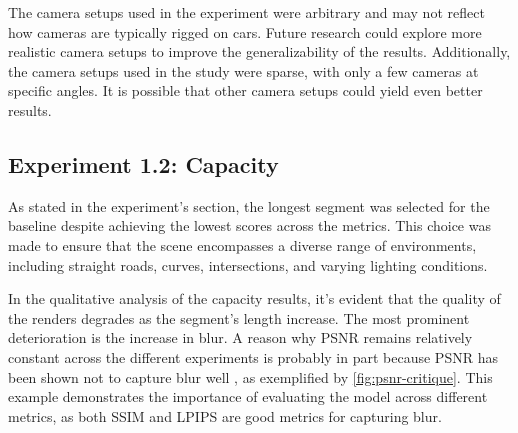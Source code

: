The camera setups used in the experiment were arbitrary and may not reflect how cameras are typically rigged on cars. Future research could explore more realistic camera setups to improve the generalizability of the results. Additionally, the camera setups used in the study were sparse, with only a few cameras at specific angles. It is possible that other camera setups could yield even better results.


\begin{comment}
- The position of the camera was arbitrary. Could've done more research into how cameras on cars usually are rigged.
- The camera setups are very sparse, a lot of different possibilities.

Results:
- Relatively little difference in the quantitative results.
- Why did the -10 and 10 yaw yield the best SSIM and LPIPS?
- The evaluation images are a subset of the training images. Because the -10 and 10 have a lot of overlap, they have a lot of common training data which will allow the model to learn the scene which it is evaluated on, in turn yielding high scores on the chosen metrics.


This overlap allows the model to train and learn the scene which it is evaluated on, because the evaluation set is a subset of the training images, more than the other setups, and it'll naturally score high on the respective images.

the model to train on the partial scene with two times the amount of data, and since the evaluation set is a subset of the training images, it'll naturally score high on the respective images.

\end{comment}










\subsection{Experiment 1.2: Capacity} 
As stated in the experiment's section, the longest segment was selected for the baseline despite achieving the lowest scores across the metrics. This choice was made to ensure that the scene encompasses a diverse range of environments, including straight roads, curves, intersections, and varying lighting conditions.

In the qualitative analysis of the capacity results, it's evident that the quality of the renders degrades as the segment's length increase. The most prominent deterioration is the increase in blur. A reason why PSNR remains relatively constant across the different experiments is probably in part because PSNR has been shown not to capture blur well \cite{videoprocessingai}, as exemplified by \autoref{fig:psnr-critique}. This example demonstrates the importance of evaluating the model across different metrics, as both SSIM and LPIPS are good metrics for capturing blur.

